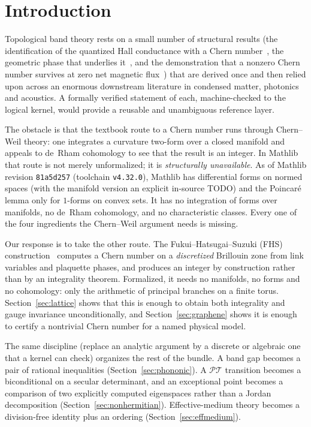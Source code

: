 \documentclass[aps,prb,reprint,nofootinbib,superscriptaddress]{revtex4-2}
\begin{document}
\section{Introduction}
\label{sec:intro}

Topological band theory rests on a small number of structural results (the identification of the quantized Hall conductance with a Chern number~\cite{TKNN1982}, the geometric phase that underlies it~\cite{Berry1984}, and the demonstration that a nonzero Chern number survives at zero net magnetic flux~\cite{Haldane1988}) that are derived once and then relied upon across an enormous downstream
literature in condensed matter, photonics and acoustics. A formally verified statement of each,
machine-checked to the logical kernel, would provide a reusable and unambiguous reference layer.

The obstacle is that the textbook route to a Chern number runs through Chern--Weil theory: one
integrates a curvature two-form over a closed manifold and appeals to de~Rham cohomology to see that
the result is an integer. In Mathlib that route is not merely unformalized; it is
\emph{structurally unavailable}. As of Mathlib revision \texttt{81a5d257} (toolchain
\texttt{v4.32.0}), Mathlib has differential forms on normed spaces (with the manifold version an explicit in-source TODO) and the Poincar\'e lemma only for $1$-forms on convex sets. It has no
integration of forms over manifolds, no de~Rham cohomology, and no characteristic classes. Every one
of the four ingredients the Chern--Weil argument needs is missing.

Our response is to take the other route. The Fukui--Hatsugai--Suzuki (FHS)
construction~\cite{FukuiHatsugaiSuzuki2005} computes a Chern number on a \emph{discretized}
Brillouin zone from link variables and plaquette phases, and produces an integer by construction
rather than by an integrality theorem. Formalized, it needs no manifolds, no forms and no cohomology: only the arithmetic of principal branches on a finite torus. Section~\ref{sec:lattice} shows that
this is enough to obtain both integrality and gauge invariance unconditionally, and
Section~\ref{sec:graphene} shows it is enough to certify a nontrivial Chern number for a named
physical model.

The same discipline (replace an analytic argument by a discrete or algebraic one that a kernel can check) organizes the rest of the bundle. A band gap becomes a pair of rational inequalities
(Section~\ref{sec:phononic}). A $\mathcal{PT}$ transition becomes a biconditional on a secular
determinant, and an exceptional point becomes a comparison of two explicitly computed eigenspaces
rather than a Jordan decomposition (Section~\ref{sec:nonhermitian}). Effective-medium theory becomes
a division-free identity plus an ordering (Section~\ref{sec:effmedium}).
\end{document}
